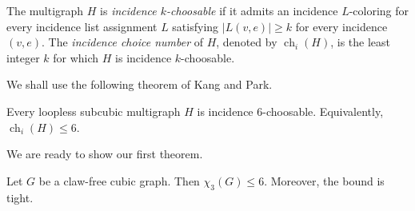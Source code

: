 The multigraph $H$ is \emph{incidence $k$-choosable} if it admits an
incidence $L$-coloring for every incidence list assignment $L$
satisfying
$
    |L(v,e)|\geq k
$
for every incidence $(v,e)$. The \emph{incidence choice number} of $H$,
denoted by $\operatorname{ch}_{i}(H)$, is the least integer $k$ for
which $H$ is incidence $k$-choosable.

We shall use the following theorem of Kang and Park.

\begin{theorem}
\label{thm:kang-park}
Every loopless subcubic multigraph $H$ is incidence
$6$-choosable. Equivalently,
$    \operatorname{ch}_{i}(H)\leq 6$.
\end{theorem}

We are ready to show our first theorem.

\begin{theorem} \label{thm:clawfreeleq6}
Let $G$ be a claw-free cubic graph. Then $\chi_3(G)\leq 6$.
Moreover, the bound is tight.
\end{theorem}

